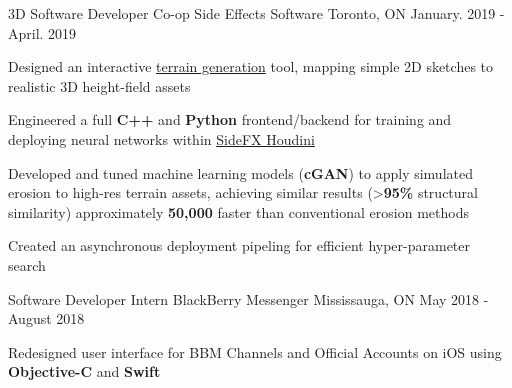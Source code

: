 \begin{cventries}
  \cventry
    {3D Software Developer Co-op} %
    {Side Effects Software} %
    {Toronto, ON} %
    {January. 2019 - April. 2019} %
    {
      \begin{cvitems} %
        \item {Designed an interactive \underline{terrain generation} tool, mapping simple 2D sketches to realistic 3D height-field assets}
        \item {Engineered a full \textbf{C++} and \textbf{Python} frontend/backend for training and deploying neural networks within \underline{SideFX Houdini}}
        \item {Developed and tuned machine learning models (\textbf{cGAN}) to
        apply simulated erosion to high-res terrain assets, achieving similar
        results (>\textbf{95\%} structural similarity) approximately
        \textbf{50,000\times} faster than conventional erosion methods}
        \item {Created an asynchronous deployment pipeling for efficient hyper-parameter search}
      \end{cvitems}
    }

  \cventry
    {Software Developer Intern} %
    {BlackBerry Messenger} %
    {Mississauga, ON} %
    {May 2018 - August 2018} %
    {
      \begin{cvitems} %
        \item {Redesigned user interface for BBM Channels and Official Accounts on iOS using \textbf{Objective-C} and \textbf{Swift}}
      \end{cvitems}
    }

\end{cventries}
